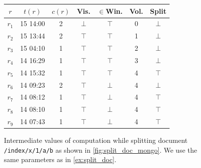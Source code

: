 \documentclass[abstracton,12pt]{scrreprt}
\begin{document}
\begin{figure}
    \begin{center}
        \begin{footnotesize}
            \begin{tabular}{|c|c|c|c|c|c|c|} 
                \hline
                $r$     & $t(r)$ &    $c(r)$ &        Vis. &      $\in$Win. &         Vol. &      Split \\
                \hline
                $r_1$ & 15 14:00 &  2 &             $\bot$ &         $\top$ &                 0 &                 $\bot$ \\ 
                \hline
                $r_2$ & 15 13:44 &  2 &             $\top$ &         $\top$ &                 1 &                 $\bot$ \\
                \hline
                $r_3$ & 15 04:10 &  1 &             $\top$ &         $\top$ &                 2 &                 $\bot$ \\
                \hline
                $r_4$ & 14 16:29 &  1 &             $\top$ &         $\top$ &                 3 &                 $\bot$ \\
                \hline
                $r_5$ & 14 15:32 &  1 &             $\top$ &         $\top$ &                 4 &                 $\top$ \\
                \hline
                $r_6$ & 14 09:23 &  2 &             $\top$ &         $\bot$ &                 4 &                 $\bot$ \\
                \hline
                $r_7$ & 14 08:12 &  1 &             $\top$ &         $\bot$ &                 4 &                 $\top$ \\
                \hline
                $r_8$ & 14 08:10 &  1 &             $\top$ &         $\bot$ &                 4 &                 $\top$ \\
                \hline
                $r_9$ & 14 07:43 &  1 &             $\top$ &         $\bot$ &                 4 &                 $\top$ \\
                \hline
            \end{tabular}
        \end{footnotesize}
    \end{center}
    \caption{
        Intermediate values of computation while splitting document \texttt{/index/x/1/a/b} as shown in \cref{fig:split_doc_mongo}.
        We use the same parameters as in \cref{ex:split_doc}.
    }
    \label{fig:split_doc_debug}
\end{figure}
\end{document}
